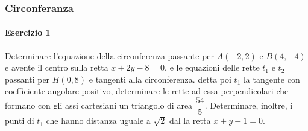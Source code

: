 \subsubsection*{\hyperref[subsec:geomana:circ]{Circonferanza}}\label{ex:circ}
\paragraph{Esercizio 1}
Determinare l'equazione della circonferenza passante per $A(-2,2)$ e $B(4,-4)$ e avente il centro
sulla retta $x+2y-8=0$, e le equazioni delle rette $t_1$ e $t_2$ passanti per $H(0,8)$ e tangenti 
alla circonferenza. detta poi $t_1$ la tangente con coefficiente angolare positivo, determinare le
rette ad essa perpendicolari che formano con gli assi cartesiani un triangolo di area 
$\dfrac{54}{5}$. Determinare, inoltre, i punti di $t_1$ che hanno distanza uguale a $\sqrt{2}$ dal
la retta $x+y-1=0$.
\divisor

